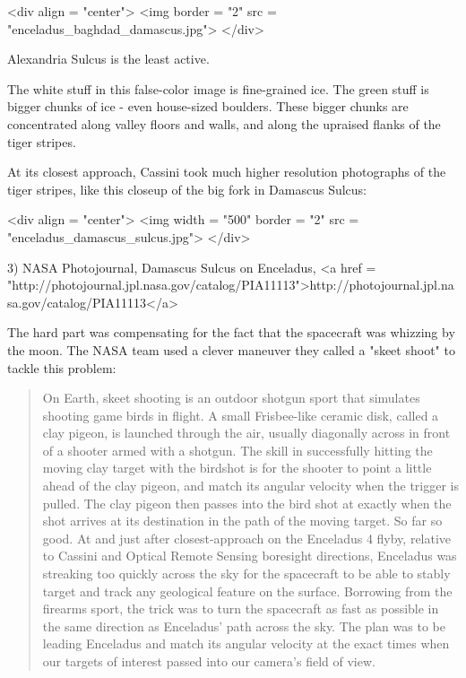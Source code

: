 <div align = "center">
<img border = "2" src = "enceladus_baghdad_damascus.jpg">
</div>

Alexandria Sulcus is the least active.  

The white stuff in this false-color image is fine-grained ice.  The
green stuff is bigger chunks of ice - even house-sized boulders.
These bigger chunks are concentrated along valley floors and walls, 
and along the upraised flanks of the tiger stripes.

At its closest approach, Cassini took much higher resolution
photographs of the tiger stripes, like this closeup of the big fork in
Damascus Sulcus:

<div align = "center">
<img width = "500" border = "2" src = "enceladus_damascus_sulcus.jpg">
</div>

3) NASA Photojournal, Damascus Sulcus on Enceladus,
<a href = "http://photojournal.jpl.nasa.gov/catalog/PIA11113">http://photojournal.jpl.nasa.gov/catalog/PIA11113</a>

The hard part was compensating for the fact that the spacecraft was
whizzing by the moon.  The NASA team used a clever maneuver they
called a "skeet shoot" to tackle this problem:

\begin{quote}
     On Earth, skeet shooting is an outdoor shotgun sport that           
     simulates shooting game birds in flight.  A small Frisbee-like 
     ceramic disk, called a clay pigeon, is launched through the air, 
     usually diagonally across in front of a shooter armed with a 
     shotgun.  The skill in successfully hitting the moving clay      
     target with the birdshot is for the shooter to point a little     
     ahead of the clay pigeon, and match its angular velocity when 
     the trigger is pulled.  The clay pigeon then passes into the 
     bird shot at exactly when the shot arrives at its destination 
     in the path of the moving target.  So far so good.  At and just
     after closest-approach on the Enceladus 4 flyby, relative to
     Cassini and Optical Remote Sensing boresight directions,
     Enceladus was streaking too quickly across the sky for the      
     spacecraft to be able to stably target and track any geological
     feature on the surface.  Borrowing from the firearms sport, the
     trick was to turn the spacecraft as fast as possible in the same
     direction as Enceladus' path across the sky.  The plan was to be
     leading Enceladus and match its angular velocity at the exact
     times when our targets of interest passed into our camera's 
     field of view.
\end{quote}
    

